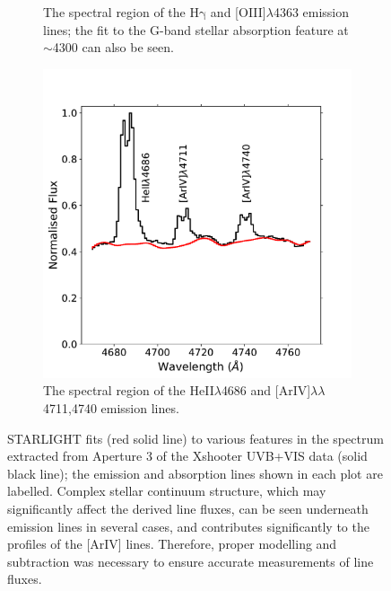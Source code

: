 \begin{figure}
\begin{subfigure}[t]{0.47\textwidth}
        \caption{The spectral region of the H$\mathrm{\gamma}$ and [OIII]$\lambda$4363 emission lines; the fit to the G-band stellar absorption feature at $\sim$4300\;{\AA} can also be seen.}
        \label{fig: xshooter_ic5063: starlight_hgamma_oiii}
    \end{subfigure}
    \hfill
    \begin{subfigure}[t]{0.47\textwidth}
        \includegraphics[width=\linewidth]{figures/xshooter_ic5063/starlight_ariv.pdf}
        \caption{The spectral region of the HeII$\lambda$4686 and [ArIV]$\lambda\lambda$4711,4740 emission lines.}
        \label{fig: xshooter_ic5063: starlight_heii_ariv}
    \end{subfigure}
    \vspace{-1.5cm}
    \caption[\textsc{STARLIGHT} stellar-synthesis fits to various key spectral features in Xshooter spectra of IC.]{\textsc{STARLIGHT} fits (red solid line) to various features in the spectrum extracted from Aperture 3 of the Xshooter UVB+VIS data (solid black line); the emission and absorption lines shown in each plot are labelled. Complex stellar continuum structure, which may significantly affect the derived line fluxes, can be seen underneath emission lines in several cases, and contributes significantly to the profiles of the [ArIV] lines. Therefore, proper modelling and subtraction was necessary to ensure accurate measurements of line fluxes.}
\end{figure}

